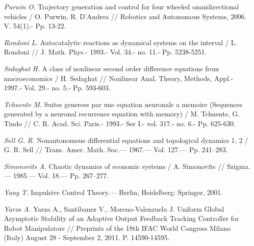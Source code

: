 \begin{thebibliography}{10}
	
	{\it Purwin O.} Trajectory generation and control for four wheeled omnidirectional vehicles / O. Purwin, R. D'Andrea // Robotics and Autonomous Systems, 2006. V. 54(1).- Pp. 13-22.
	
	{\it Rondoni L.} Autocatalytic reactions as dynamical systems on the interval / L. Rondoni // J. Math. Phys.- 1993.- Vol. 34.- no. 11.- Pp. 5238-5251.
	
	{\it Sedaghat H.} A class of nonlinear second order difference equations from macroeconomics / H. Sedaghat // Nonlinear Anal. Theory, Methods, Appl.- 1997.- Vol. 29.- no. 5.- Pp. 593-603.
	
	{\it Tchuente M.} Suites generees par une equation neuronale a memoire (Sequences generated by a neuronal recurrence equation with memory) / M. Tchuente, G. Tindo // C. R. Acad. Sci. Paris.- 1993.- Ser I.- vol. 317.- no. 6.- Pp. 625-630.
	
	{\it Sell G. R.} Nonautonomous differential equations and topological dynamics 1, 2 /
	G. R. Sell // Trans. Amer. Math. Soc.— 1967.— Vol. 127.— Pp. 241–283.
	
	{\it Simonovits A.} Chaotic dynamics of economic systems /
	A. Simonovits // Szigma.— 1985.— Vol. 18.— Pp. 267–277.
	
	{\it Yang T.} Impulsive Control Theory.— Berlin, Heidelberg: Springer, 2001.
	
	{\it Yarza A.} Yarza A., Santibanez V., Moreno-Valenzuela J. Uniform Global Asymptotic Stability of an Adaptive Output Feedback Tracking Controller for Robot Manipulators // Preprints of the 18th IFAC World Congress Milano (Italy) August 28 - September 2, 2011. P. 14590-14595. 
	
	
\end{thebibliography} 